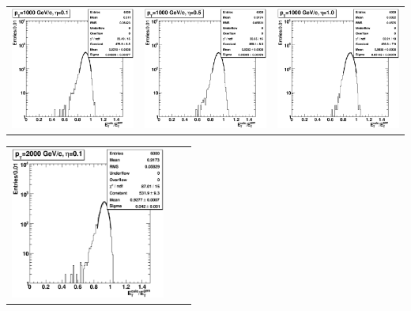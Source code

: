 \documentclass{cmspaper}
\begin{document}
\begin{appendices}
\begin{center}
\begin{tabular}{lll}
\end{tabular}
\end{center}
\begin{center}
\begin{tabular}{lll}
 \includegraphics[width=2in]{figs/h_ETRatio_ET_py_fit_corr_eta0.1_pT1000.eps} &
 \includegraphics[width=2in]{figs/h_ETRatio_ET_py_fit_corr_eta0.5_pT1000.eps} &
 \includegraphics[width=2in]{figs/h_ETRatio_ET_py_fit_corr_eta1.0_pT1000.eps} \\
\end{tabular}
\end{center}
\begin{center}
\begin{tabular}{lll}
 \includegraphics[width=2in]{figs/h_ETRatio_ET_py_fit_corr_eta0.1_pT2000.eps} &

\end{tabular}
\end{center}
\end{appendices}
\end{document}
